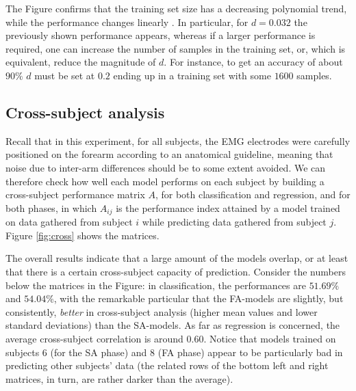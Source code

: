 \documentclass[10pt]{bmc_article}
\def\texttt{[image: ]}
\newenvironment{bmcformat}
  {\begin{raggedright}\baselineskip20pt\sloppy\setboolean{publ}{false}}
  {\end{raggedright}\baselineskip20pt\sloppy}
\begin{document}
\begin{bmcformat}
The Figure confirms that the training set size has a decreasing
polynomial trend, while the performance changes linearly
\cite{2008.BioCyb}. In
particular, for $d=0.032$ the previously shown performance appears,
whereas if a larger performance is required, one can increase the
number of samples in the training set, or, which is equivalent, reduce
the magnitude of $d$. For instance, to get an accuracy of about $90\%$
$d$ must be set at $0.2$ ending up in a training set with some $1600$
samples.

\subsection*{Cross-subject analysis}

Recall that in this experiment, for all subjects, the EMG electrodes
were carefully positioned on the forearm according to an anatomical
guideline, meaning that noise due to inter-arm differences should be
to some extent avoided. We can therefore check how well each model
performs on each subject by building a cross-subject performance
matrix $A$, for both classification and regression, and for both phases,
in which $A_{ij}$ is the performance index attained by a model trained
on data gathered from subject $i$ while predicting data gathered from
subject $j$.  Figure \ref{fig:cross} shows the matrices.


The overall results indicate that a large amount of the models
overlap, or at least that there is a certain cross-subject capacity of
prediction. Consider the numbers below the matrices in the Figure: in
classification, the performances are $51.69\%$ and $54.04\%$, with the
remarkable particular that the FA-models are slightly, but
consistently, \emph{better} in cross-subject analysis (higher mean
values and lower standard deviations) than the SA-models. As far as
regression is concerned, the average cross-subject correlation is
around $0.60$. Notice that models trained
on subjects $6$ (for the SA phase) and $8$ (FA phase) appear to be
particularly bad in predicting other subjects' data (the related rows
of the bottom left and right matrices, in turn, are rather darker than
the average).


\end{bmcformat}
\end{document}
